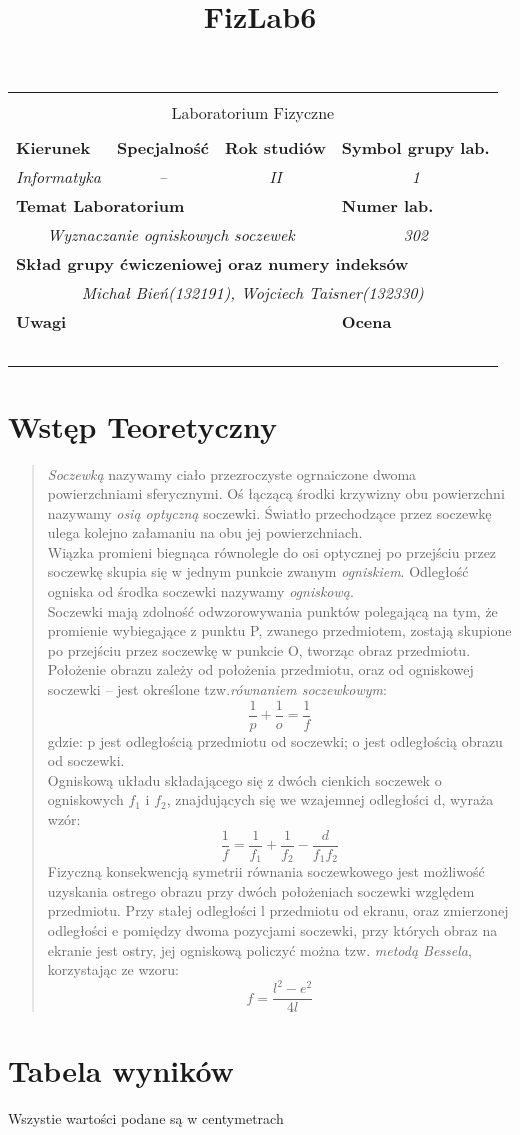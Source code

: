 \documentclass[polish,a4paper]{article}
\title{FizLab6}
\newcommand{\PRzFieldDsc}[1]{\sffamily\bfseries\scriptsize #1}
\newcommand{\PRzFieldCnt}[1]{\textit{#1}}
\newcommand{\PRzHeading}[8]{
\begin{center}
\begin{tabular}{ p{0.32\textwidth} p{0.15\textwidth} p{0.15\textwidth} p{0.12\textwidth} p{0.12\textwidth} }

  &   &   &   &   \\
\hline
\multicolumn{5}{|c|}{}\\[-1ex]
\multicolumn{5}{|c|}{{\LARGE #1}}\\
\multicolumn{5}{|c|}{}\\[-1ex]

\hline
\multicolumn{1}{|l|}{\PRzFieldDsc{Kierunek}}	& \multicolumn{1}{|l|}{\PRzFieldDsc{Specjalność}}	& \multicolumn{1}{|l|}{\PRzFieldDsc{Rok studiów}}	& \multicolumn{2}{|l|}{\PRzFieldDsc{Symbol grupy lab.}} \\
\multicolumn{1}{|c|}{\PRzFieldCnt{#2}}		& \multicolumn{1}{|c|}{\PRzFieldCnt{#3}}		& \multicolumn{1}{|c|}{\PRzFieldCnt{#4}}		& \multicolumn{2}{|c|}{\PRzFieldCnt{#5}} \\

\hline
\multicolumn{4}{|l|}{\PRzFieldDsc{Temat Laboratorium}}		& \multicolumn{1}{|l|}{\PRzFieldDsc{Numer lab.}} \\
\multicolumn{4}{|c|}{\PRzFieldCnt{#6}}				& \multicolumn{1}{|c|}{\PRzFieldCnt{#7}} \\

\hline
\multicolumn{5}{|l|}{\PRzFieldDsc{Skład grupy ćwiczeniowej oraz numery indeksów}}\\
\multicolumn{5}{|c|}{\PRzFieldCnt{#8}}\\

\hline
\multicolumn{3}{|l|}{\PRzFieldDsc{Uwagi}}	& \multicolumn{2}{|l|}{\PRzFieldDsc{Ocena}} \\
\multicolumn{3}{|c|}{\PRzFieldCnt{\ }}		& \multicolumn{2}{|c|}{\PRzFieldCnt{\ }} \\

\hline
\end{tabular}
\end{center}
}
\begin{document}
\PRzHeading{Laboratorium Fizyczne}{Informatyka}{--}{II}{1}{ Wyznaczanie ogniskowych soczewek}{302}{Michał Bień(132191), Wojciech Taisner(132330)}{}

\section{Wstęp Teoretyczny}
\begin{quotation}\cite{szuba}
\emph{Soczewką} nazywamy ciało przezroczyste ogrnaiczone dwoma powierzchniami sferycznymi. Oś łączącą środki krzywizny obu powierzchni nazywamy \emph{osią optyczną} soczewki. Światło przechodzące przez soczewkę ulega kolejno załamaniu na obu jej powierzchniach.\\
Wiązka promieni biegnąca równolegle do osi optycznej po przejściu przez soczewkę skupia się w jednym punkcie zwanym \emph{ogniskiem}. Odległość ogniska od środka soczewki nazywamy \emph{ogniskową}.\\
Soczewki mają zdolność odwzorowywania punktów polegającą na tym, że promienie wybiegające z punktu P, zwanego przedmiotem, zostają skupione po przejściu przez soczewkę w punkcie O, tworząc obraz przedmiotu. Położenie obrazu zależy od położenia przedmiotu, oraz od ogniskowej soczewki -- jest określone tzw.\emph{równaniem soczewkowym}: $$\frac{1}{p} + \frac{1}{o} = \frac{1}{f}$$gdzie: p jest odległością przedmiotu od soczewki; o jest odległością obrazu od soczewki.\\
Ogniskową układu składającego się z dwóch cienkich soczewek o ogniskowych $f_1$ i $f_2$, znajdujących się we wzajemnej odległości d, wyraża wzór: $$\frac{1}{f} = \frac{1}{f_1} + \frac{1}{f_2} - \frac{d}{f_1f_2}$$ Fizyczną konsekwencją symetrii równania soczewkowego jest możliwość uzyskania ostrego obrazu przy dwóch położeniach soczewki względem przedmiotu. Przy stałej odległości l przedmiotu od ekranu, oraz zmierzonej odległości e pomiędzy dwoma pozycjami soczewki, przy których obraz na ekranie jest ostry, jej ogniskową policzyć można tzw. \emph{metodą Bessela}, korzystając ze wzoru: $$ f = \frac{l^2-e^2}{4l} $$
\end{quotation}


\section{Tabela wyników}
Wszystie wartości podane są w centymetrach
\end{document}
